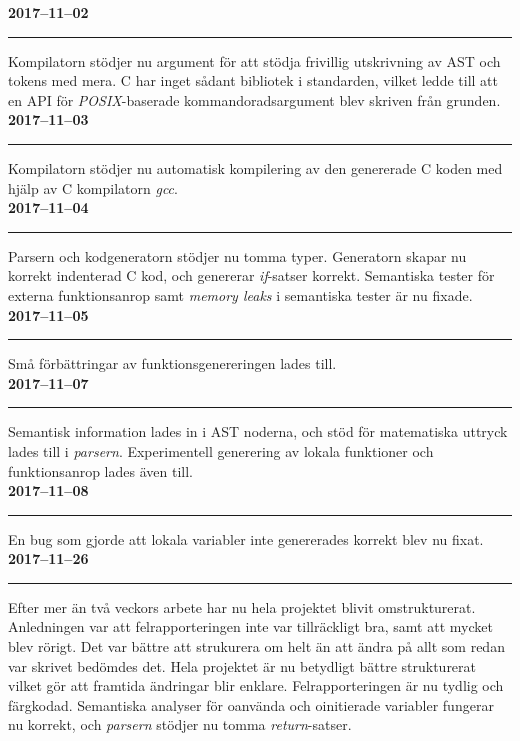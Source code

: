 \documentclass{theme}
\begin{document}
\noindent\textbf{2017--11--02}\\
\noindent\rule{\textwidth}{1pt}

\noindent
Kompilatorn stödjer nu argument för att stödja frivillig utskrivning av AST och
tokens med mera. C har inget sådant bibliotek i standarden, vilket ledde till
att en API för \textit{POSIX}-baserade kommandoradsargument blev skriven från
grunden.\\

\noindent\textbf{2017--11--03}\\
\noindent\rule{\textwidth}{1pt}

\noindent
Kompilatorn stödjer nu automatisk kompilering av den genererade C koden med
hjälp av C kompilatorn \textit{gcc}. \\

\noindent\textbf{2017--11--04}\\
\noindent\rule{\textwidth}{1pt}

\noindent
Parsern och kodgeneratorn stödjer nu tomma typer. Generatorn skapar nu korrekt
indenterad C kod, och genererar \textit{if}-satser korrekt. Semantiska tester
för externa funktionsanrop samt \textit{memory leaks} i semantiska tester är nu 
fixade. \\

\noindent\textbf{2017--11--05}\\
\noindent\rule{\textwidth}{1pt}

\noindent
Små förbättringar av funktionsgenereringen lades till.\\

\noindent\textbf{2017--11--07}\\
\noindent\rule{\textwidth}{1pt}

\noindent
Semantisk information lades in i AST noderna, och stöd för matematiska uttryck
lades till i \textit{parsern}. Experimentell generering av lokala funktioner och
funktionsanrop lades även till. \\

\noindent\textbf{2017--11--08}\\
\noindent\rule{\textwidth}{1pt}

\noindent
En bug som gjorde att lokala variabler inte genererades korrekt blev nu fixat.
\\

\noindent\textbf{2017--11--26}\\
\noindent\rule{\textwidth}{1pt}

\noindent
Efter mer än två veckors arbete har nu hela projektet blivit omstrukturerat. 
Anledningen var att felrapporteringen inte var tillräckligt bra, samt att mycket
blev rörigt. Det var bättre att strukurera om helt än att ändra på allt som 
redan var skrivet bedömdes det. Hela projektet är nu betydligt bättre
strukturerat vilket gör att framtida ändringar blir enklare. Felrapporteringen 
är nu tydlig och färgkodad. Semantiska analyser för oanvända och oinitierade 
variabler fungerar nu korrekt, och \textit{parsern} stödjer nu tomma
\textit{return}-satser. \\
\end{document}
